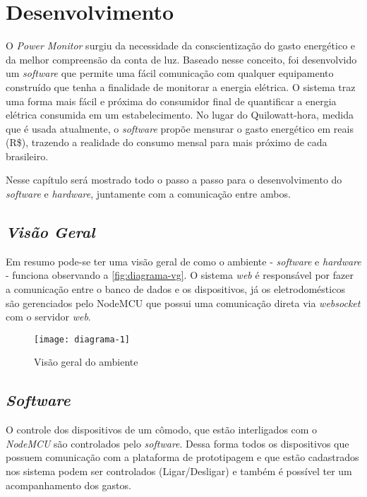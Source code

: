 \chapter[Desenvolvimento]{Desenvolvimento}
\label{ch:desenvolvimento}
O \textit{Power Monitor} surgiu da necessidade da conscientização do gasto energético e da melhor compreensão da conta de luz. Baseado nesse conceito,
foi desenvolvido um \textit{software} que permite uma fácil comunicação com qualquer equipamento construído que tenha a finalidade de monitorar a energia elétrica. 
O sistema traz uma forma mais fácil e próxima do consumidor final de quantificar a energia elétrica consumida em um estabelecimento. No lugar do Quilowatt-hora, medida que é usada atualmente,
o \textit{software} propõe mensurar o gasto energético em reais (R\$), trazendo a realidade do consumo mensal para mais próximo de cada brasileiro.

Nesse capítulo será mostrado todo o passo a passo para o desenvolvimento do \textit{software} e \textit{hardware}, juntamente com a comunicação 
entre ambos. 


\section[\textit{Visão Geral}]{\textit{Visão Geral}}\label{visal-geral}

Em resumo pode-se ter uma visão geral de como o ambiente - \textit{software} e \textit{hardware} - funciona observando a \autoref{fig:diagrama-vg}.
O sistema \textit{web} é responsável por fazer a comunicação entre o banco de dados e os dispositivos, já os eletrodomésticos são gerenciados
pelo NodeMCU que possui uma comunicação direta via \textit{websocket} com o servidor \textit{web}.

\begin{figure}[h!]
	\texttt{[image: diagrama-1]}
	\centering
	\caption[Visão geral do ambiente]{Visão geral do ambiente}
	\label{fig:diagrama-vg}
\end{figure}
\FloatBarrier

\section[\textit{Software}]{\textit{Software}}\label{soft-sec}
O controle dos dispositivos de um cômodo, que estão interligados com o \textit{NodeMCU} são controlados pelo \textit{software}. Dessa forma
todos os dispositivos que possuem comunicação com a plataforma de prototipagem e que estão cadastrados nos sistema podem ser controlados (Ligar/Desligar) e também
é possível ter um acompanhamento dos gastos.


